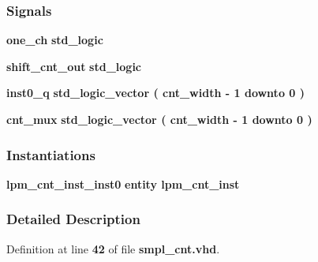 \subsubsection*{Signals}
 \begin{DoxyCompactItemize}
\item 
{\bf one\+\_\+ch} {\bfseries \textcolor{comment}{std\+\_\+logic}\textcolor{vhdlchar}{ }} 
\item 
{\bf shift\+\_\+cnt\+\_\+out} {\bfseries \textcolor{comment}{std\+\_\+logic}\textcolor{vhdlchar}{ }} 
\item 
{\bf inst0\+\_\+q} {\bfseries \textcolor{comment}{std\+\_\+logic\+\_\+vector}\textcolor{vhdlchar}{ }\textcolor{vhdlchar}{(}\textcolor{vhdlchar}{ }\textcolor{vhdlchar}{ }\textcolor{vhdlchar}{ }\textcolor{vhdlchar}{ }{\bfseries {\bf cnt\+\_\+width}} \textcolor{vhdlchar}{-\/}\textcolor{vhdlchar}{ } \textcolor{vhdldigit}{1} \textcolor{vhdlchar}{ }\textcolor{keywordflow}{downto}\textcolor{vhdlchar}{ }\textcolor{vhdlchar}{ } \textcolor{vhdldigit}{0} \textcolor{vhdlchar}{ }\textcolor{vhdlchar}{)}\textcolor{vhdlchar}{ }} 
\item 
{\bf cnt\+\_\+mux} {\bfseries \textcolor{comment}{std\+\_\+logic\+\_\+vector}\textcolor{vhdlchar}{ }\textcolor{vhdlchar}{(}\textcolor{vhdlchar}{ }\textcolor{vhdlchar}{ }\textcolor{vhdlchar}{ }\textcolor{vhdlchar}{ }{\bfseries {\bf cnt\+\_\+width}} \textcolor{vhdlchar}{-\/}\textcolor{vhdlchar}{ } \textcolor{vhdldigit}{1} \textcolor{vhdlchar}{ }\textcolor{keywordflow}{downto}\textcolor{vhdlchar}{ }\textcolor{vhdlchar}{ } \textcolor{vhdldigit}{0} \textcolor{vhdlchar}{ }\textcolor{vhdlchar}{)}\textcolor{vhdlchar}{ }} 
\end{DoxyCompactItemize}
\subsubsection*{Instantiations}
 \begin{DoxyCompactItemize}
\item 
{\bf lpm\+\_\+cnt\+\_\+inst\+\_\+inst0}  {\bfseries entity lpm\+\_\+cnt\+\_\+inst}   
\end{DoxyCompactItemize}


\subsubsection{Detailed Description}


Definition at line {\bf 42} of file {\bf smpl\+\_\+cnt.\+vhd}.



